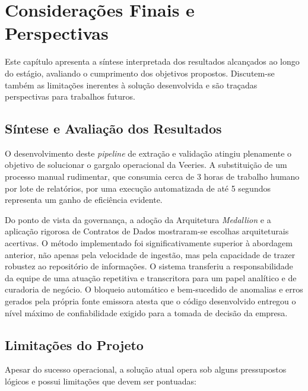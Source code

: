 \chapter{Considerações Finais e Perspectivas}

Este capítulo apresenta a síntese interpretada dos resultados alcançados ao longo do estágio, avaliando o cumprimento dos objetivos propostos. Discutem-se também as limitações inerentes à solução desenvolvida e são traçadas perspectivas para trabalhos futuros.

\section{Síntese e Avaliação dos Resultados}

O desenvolvimento deste \textit{pipeline} de extração e validação atingiu plenamente o objetivo de solucionar o gargalo operacional da Veeries. A substituição de um processo manual rudimentar, que consumia cerca de 3 horas de trabalho humano por lote de relatórios, por uma execução automatizada de até 5 segundos representa um ganho de eficiência evidente.

Do ponto de vista da governança, a adoção da Arquitetura \textit{Medallion} e a aplicação rigorosa de Contratos de Dados mostraram-se escolhas arquiteturais acertivas. O método implementado foi significativamente superior à abordagem anterior, não apenas pela velocidade de ingestão, mas pela capacidade de trazer robustez ao repositório de informações. O sistema transferiu a responsabilidade da equipe de uma atuação repetitiva e transcritora para um papel analítico e de curadoria de negócio. O bloqueio automático e bem-sucedido de anomalias e erros gerados pela própria fonte emissora atesta que o código desenvolvido entregou o nível máximo de confiabilidade exigido para a tomada de decisão da empresa.

\section{Limitações do Projeto}

Apesar do sucesso operacional, a solução atual opera sob alguns pressupostos lógicos e possui limitações que devem ser pontuadas:

